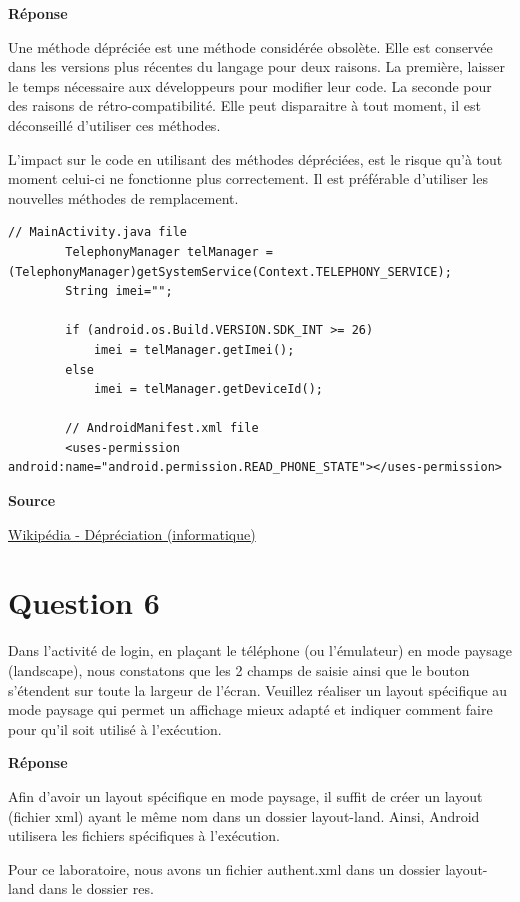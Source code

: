 \documentclass[francais,12pt]{article}
\begin{document}
		{\color[rgb]{0,0.5,0.23}\textbf{Réponse}}
        
		Une méthode dépréciée est une méthode considérée obsolète. Elle est conservée dans les versions plus récentes du langage pour deux raisons. La première, laisser le temps nécessaire aux développeurs pour modifier leur code. La seconde pour des raisons de rétro-compatibilité. Elle peut disparaitre à tout moment, il est déconseillé d'utiliser ces méthodes. 
		
		L'impact sur le code en utilisant des méthodes dépréciées, est le risque qu'à tout moment celui-ci ne fonctionne plus correctement. Il est préférable d'utiliser les nouvelles méthodes de remplacement.\newline		
		 \begin{lstlisting}[style=javaCode]
		// MainActivity.java file
		TelephonyManager telManager = (TelephonyManager)getSystemService(Context.TELEPHONY_SERVICE);
		String imei="";
		
		if (android.os.Build.VERSION.SDK_INT >= 26)
			imei = telManager.getImei();
		else
			imei = telManager.getDeviceId();
				
		// AndroidManifest.xml file
		<uses-permission android:name="android.permission.READ_PHONE_STATE"></uses-permission>
		\end{lstlisting}
	
		\textbf{Source}
	
		\href{https://fr.wikipedia.org/wiki/Dépréciation_(informatique)}{Wikipédia - Dépréciation (informatique)}	

		
	\section*{Question 6}
		Dans l'activité de login, en plaçant le téléphone (ou l'émulateur) en mode paysage (landscape), nous constatons que les 2 champs de saisie ainsi que le bouton s'étendent sur toute la largeur de l'écran. Veuillez réaliser un layout spécifique au mode paysage qui permet un affichage mieux adapté et indiquer comment faire pour qu'il soit utilisé à l'exécution.  
		
		{\color[rgb]{0,0.5,0.23}\textbf{Réponse}}
        
        Afin d'avoir un layout spécifique en mode paysage, il suffit de créer un layout (fichier xml) ayant le même nom dans un dossier layout-land. Ainsi, Android utilisera les fichiers spécifiques à l'exécution.
        
        Pour ce laboratoire, nous avons un fichier authent.xml dans un dossier layout-land dans le dossier res.
		
\end{document}
